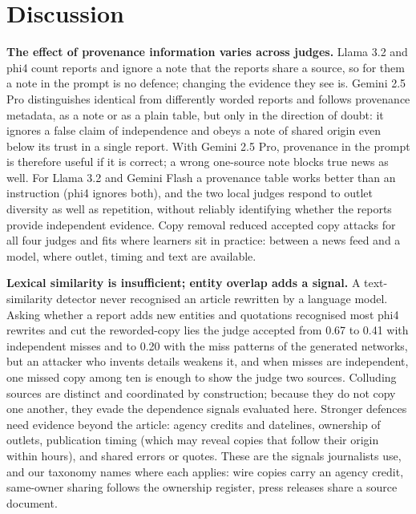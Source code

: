 \section{Discussion}\label{sec:discussion}

\textbf{The effect of provenance information varies across judges.} Llama 3.2 and phi4 count reports and ignore a note that the reports share a source, so for them a note in the prompt is no defence; changing the evidence they see is. Gemini 2.5 Pro distinguishes identical from differently worded reports and follows provenance metadata, as a note or as a plain table, but only in the direction of doubt: it ignores a false claim of independence and obeys a note of shared origin even below its trust in a single report. With Gemini 2.5 Pro, provenance in the prompt is therefore useful if it is correct; a wrong one-source note blocks true news as well. For Llama 3.2 and Gemini Flash a provenance table works better than an instruction (phi4 ignores both), and the two local judges respond to outlet diversity as well as repetition, without reliably identifying whether the reports provide independent evidence. Copy removal reduced accepted copy attacks for all four judges and fits where learners sit in practice: between a news feed and a model, where outlet, timing and text are available.

\textbf{Lexical similarity is insufficient; entity overlap adds a signal.} A text-similarity detector never recognised an article rewritten by a language model. Asking whether a report adds new entities and quotations recognised most phi4 rewrites and cut the reworded-copy lies the judge accepted from 0.67 to 0.41 with independent misses and to 0.20 with the miss patterns of the generated networks, but an attacker who invents details weakens it, and when misses are independent, one missed copy among ten is enough to show the judge two sources. Colluding sources are distinct and coordinated by construction; because they do not copy one another, they evade the dependence signals evaluated here. Stronger defences need evidence beyond the article: agency credits and datelines, ownership of outlets, publication timing (which may reveal copies that follow their origin within hours), and shared errors or quotes. These are the signals journalists use, and our taxonomy names where each applies: wire copies carry an agency credit, same-owner sharing follows the ownership register, press releases share a source document.

